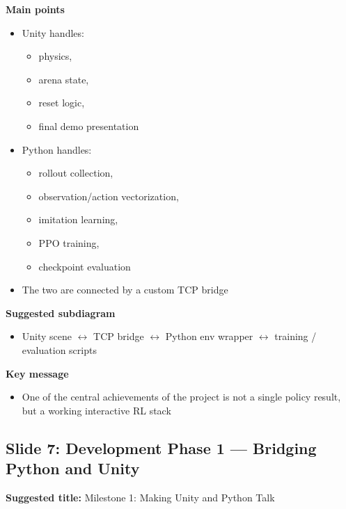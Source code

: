 \documentclass[11pt]{article}
\begin{document}
\textbf{Main points}
\begin{itemize}
    \item Unity handles:
    \begin{itemize}
        \item physics,
        \item arena state,
        \item reset logic,
        \item final demo presentation
    \end{itemize}
    \item Python handles:
    \begin{itemize}
        \item rollout collection,
        \item observation/action vectorization,
        \item imitation learning,
        \item PPO training,
        \item checkpoint evaluation
    \end{itemize}
    \item The two are connected by a custom TCP bridge
\end{itemize}

\textbf{Suggested subdiagram}
\begin{itemize}
    \item Unity scene $\leftrightarrow$ TCP bridge $\leftrightarrow$ Python env wrapper $\leftrightarrow$ training / evaluation scripts
\end{itemize}

\textbf{Key message}
\begin{itemize}
    \item One of the central achievements of the project is not a single policy result, but a working interactive RL stack
\end{itemize}

\subsection*{Slide 7: Development Phase 1 --- Bridging Python and Unity}

\textbf{Suggested title:} Milestone 1: Making Unity and Python Talk
\end{document}
